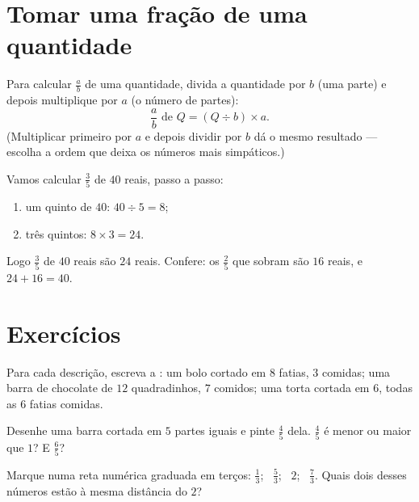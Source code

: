 \section{Tomar uma fração de uma quantidade}

\begin{method}\label{met:g6:fractions:ofquantity}
Para calcular $\frac ab$ de uma quantidade, divida a quantidade por $b$
(uma parte) e depois multiplique por $a$ (o número de partes):
\[
\frac ab \text{ de } Q = (Q \div b) \times a .
\]
(Multiplicar primeiro por $a$ e depois dividir por $b$ dá o mesmo
resultado --- escolha a ordem que deixa os números mais simpáticos.)
\end{method}

\begin{example}\label{ex:g6:fractions:ofquantity}
Vamos calcular $\frac35$ de $40$ reais, passo a passo:
\begin{enumerate}
  \item um quinto de $40$: $40 \div 5 = 8$;
  \item três quintos: $8 \times 3 = 24$.
\end{enumerate}
Logo $\frac35$ de $40$ reais são $24$ reais. Confere: os $\frac25$ que
sobram são $16$ reais, e $24 + 16 = 40$.
\end{example}

\section{Exercícios}

\begin{exercise}[$\star$]\label{exo:g6:fractions:1}
Para cada descrição, escreva a : um bolo cortado em $8$ fatias,
$3$ comidas; uma barra de chocolate de $12$ quadradinhos, $7$ comidos;
uma torta cortada em $6$, todas as $6$ fatias comidas.
\end{exercise}

\begin{exercise}[$\star$]\label{exo:g6:fractions:2}
Desenhe uma barra cortada em $5$ partes iguais e pinte $\frac45$ dela.
$\frac45$ é menor ou maior que $1$? E $\frac65$?
\end{exercise}

\begin{exercise}[$\star$]\label{exo:g6:fractions:3}
Marque numa reta numérica graduada em terços: $\frac13$; \ $\frac53$;
\ $2$; \ $\frac73$. Quais dois desses números estão à mesma distância
do $2$?
\end{exercise}

